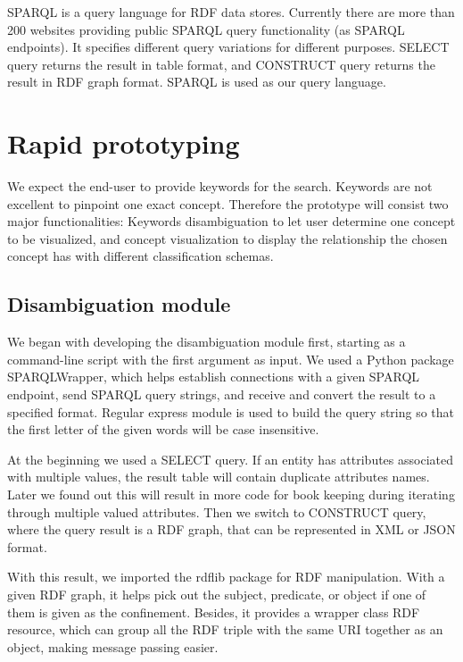 \documentclass[12pt]{cls}
\begin{document}
SPARQL is a query language for RDF data stores. Currently there are more than 200 websites providing public SPARQL query functionality (as SPARQL endpoints). It specifies different query variations for different purposes. SELECT query returns the result in table format, and CONSTRUCT query returns the result in RDF graph format. SPARQL is used as our query language.

\section{Rapid prototyping}

We expect the end-user to provide keywords for the search. Keywords are not excellent to pinpoint one exact concept. Therefore the prototype will consist two major functionalities: Keywords disambiguation to let user determine one concept to be visualized, and concept visualization to display the relationship the chosen concept has with different classification schemas. 

\subsection{Disambiguation module}

We began with developing the disambiguation module first, starting as a command-line script with the first argument as input. We used a Python package SPARQLWrapper, which helps establish connections with a given SPARQL endpoint, send SPARQL query strings, and receive and convert the result to a specified format. Regular express module is used to build the query string so that the first letter of the given words will be case insensitive.

At the beginning we used a SELECT query. If an entity has attributes associated with multiple values, the result table will contain duplicate attributes names. Later we found out this will result in more code for book keeping during iterating through multiple valued attributes. Then we switch to CONSTRUCT query, where the query result is a RDF graph, that can be represented in XML or JSON format.

With this result, we imported the rdflib package for RDF manipulation. With a given RDF graph, it helps pick out the subject, predicate, or object if one of them is given as the confinement. Besides, it provides a wrapper class RDF resource, which can group all the RDF triple with the same URI together as an object, making message passing easier.
\end{document}
